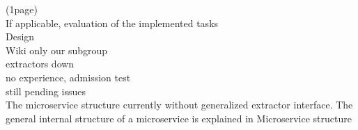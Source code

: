 (1page)\\
If applicable, evaluation of the implemented tasks \\
Design\\
Wiki only our subgroup\\
extractors down\\
no experience, admission test\\
still pending issues\\
The microservice structure currently without generalized extractor interface. The general internal structure of a microservice is explained in Microservice structure\\